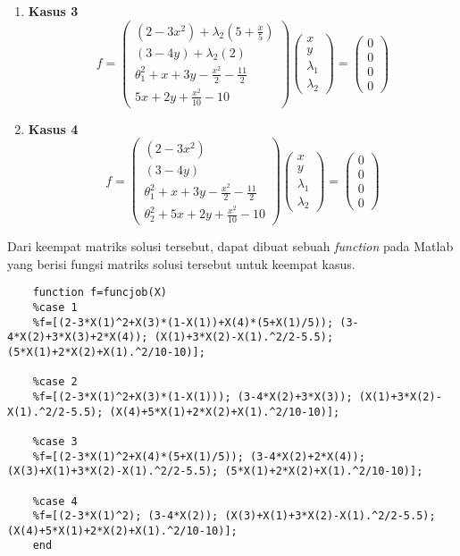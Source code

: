 \documentclass{article}
\begin{document}
\begin{enumerate}
    \item \textbf{Kasus 3}
    \subitem
    \begin{displaymath}
    f=
    \begin{pmatrix}
    (2-3x^2)+\lambda_2(5+\frac{x}{5})\\
    (3-4y)+\lambda_2(2)\\
    \theta_1^2+x+3y-\frac{x^2}{2}-\frac{11}{2}\\
    5x+2y+\frac{x^2}{10}-10
    \end{pmatrix}
    \begin{pmatrix}
        x\\y\\ \lambda_1 \\ \lambda_2
    \end{pmatrix}=
    \begin{pmatrix}
        0 \\ 0 \\ 0 \\ 0
    \end{pmatrix}
    \end{displaymath}
    
    \item \textbf{Kasus 4}
    \subitem
    \begin{displaymath}
    f=
    \begin{pmatrix}
    (2-3x^2)\\
    (3-4y)\\
    \theta_1^2+x+3y-\frac{x^2}{2}-\frac{11}{2}\\
    \theta_2^2+5x+2y+\frac{x^2}{10}-10
    \end{pmatrix}
    \begin{pmatrix}
        x\\y\\ \lambda_1 \\ \lambda_2
    \end{pmatrix}=
    \begin{pmatrix}
        0 \\ 0 \\ 0 \\ 0
    \end{pmatrix}
    \end{displaymath}
    
\end{enumerate}
\bigskip
Dari keempat matriks solusi tersebut, dapat dibuat sebuah \textit{function} pada Matlab yang berisi fungsi matriks solusi tersebut untuk keempat kasus.
\begin{lstlisting}
    function f=funcjob(X)
    %case 1
    %f=[(2-3*X(1)^2+X(3)*(1-X(1))+X(4)*(5+X(1)/5)); (3-4*X(2)+3*X(3)+2*X(4)); (X(1)+3*X(2)-X(1).^2/2-5.5); (5*X(1)+2*X(2)+X(1).^2/10-10)];

    %case 2
    %f=[(2-3*X(1)^2+X(3)*(1-X(1))); (3-4*X(2)+3*X(3)); (X(1)+3*X(2)-X(1).^2/2-5.5); (X(4)+5*X(1)+2*X(2)+X(1).^2/10-10)];

    %case 3
    %f=[(2-3*X(1)^2+X(4)*(5+X(1)/5)); (3-4*X(2)+2*X(4)); (X(3)+X(1)+3*X(2)-X(1).^2/2-5.5); (5*X(1)+2*X(2)+X(1).^2/10-10)];

    %case 4
    %f=[(2-3*X(1)^2); (3-4*X(2)); (X(3)+X(1)+3*X(2)-X(1).^2/2-5.5); (X(4)+5*X(1)+2*X(2)+X(1).^2/10-10)];
    end
\end{lstlisting}
\end{document}
